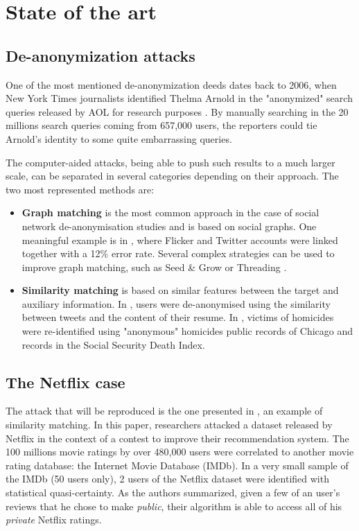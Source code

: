 \section{State of the art}\label{sec:state}

\subsection{De-anonymization attacks}

One of the most mentioned de-anonymization deeds dates back to 2006, when New York Times journalists identified Thelma Arnold in the "anonymized" search queries released by AOL for research purposes \cite{nytimes}. By manually searching in the 20 millions search queries coming from 657,000 users, the reporters could tie Arnold's identity to some quite embarrassing queries.

The computer-aided attacks, being able to push such results to a much larger scale, can be separated in several categories depending on their approach. The two most represented methods are\cite{survey}:

\begin{itemize}
	\item \textbf{Graph matching} is the most common approach in the case of social network de-anonymisation studies and is based on social graphs. One meaningful example is in \cite{graph_twitter}, where Flicker and Twitter accounts were linked together with a 12\% error rate. Several complex strategies can be used to improve graph matching, such as Seed \& Grow \cite{seed} or Threading \cite{threading}.
	
	\item \textbf{Similarity matching} is based on similar features between the target and auxiliary information. In \cite{tweets}, users were de-anonymised using the similarity between tweets and the content of their resume. In \cite{homicide}, victims of homicides were re-identified using "anonymous" homicides public records of Chicago and records in the Social Security Death Index.
\end{itemize}

\subsection{The Netflix case}

The attack that will be reproduced is the one presented in \cite{netflix}, an example of similarity matching. In this paper, researchers attacked a dataset released by Netflix in the context of a contest to improve their recommendation system. The 100 millions movie ratings by over 480,000 users were correlated to another movie rating database: the Internet Movie Database (IMDb). In a very small sample of the IMDb (50 users only), 2 users of the Netflix dataset were identified with statistical quasi-certainty. As the authors summarized, given a few of an user's reviews that he chose to make \textit{public}, their algorithm is able to access all of his \textit{private} Netflix ratings. 

